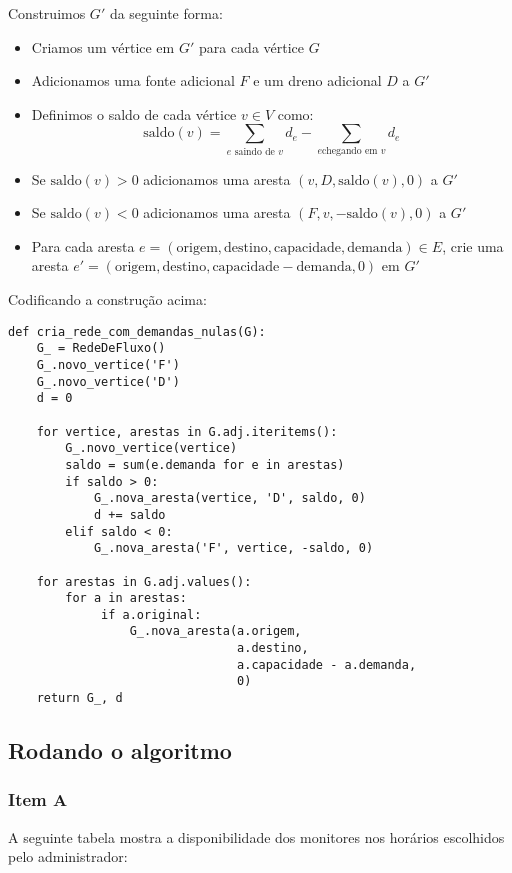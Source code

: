 \documentclass[11pt]{article}
\begin{document}
Construimos $G'$ da seguinte forma:

\begin{itemize}
\item Criamos um vértice em $G'$ para cada vértice $G$
\item Adicionamos uma fonte adicional $F$ e um dreno adicional $D$ a $G'$
\item Definimos o saldo de cada vértice $v \in V$ como: \[
  \textrm{saldo}(v) = \sum_{e \text{ saindo de }v}d_e - \sum_{e \text{
  chegando em }v}d_e \]
\item Se $\mathrm{saldo}(v) > 0$ adicionamos uma aresta $(v, D,
  \mathrm{saldo}(v), 0)$ a $G'$
\item Se $\mathrm{saldo}(v) < 0$ adicionamos uma aresta $(F, v,
  -\mathrm{saldo}(v), 0)$ a $G'$
\item Para cada aresta $e = (\mathrm{origem, destino, capacidade,
  demanda}) \in E$, crie uma aresta $e' = (\mathrm{origem, destino,
  capacidade - demanda, 0})$ em $G'$
\end{itemize}

Codificando a construção acima:
\begin{verbatim}
def cria_rede_com_demandas_nulas(G):
    G_ = RedeDeFluxo()
    G_.novo_vertice('F')
    G_.novo_vertice('D')
    d = 0

    for vertice, arestas in G.adj.iteritems():
        G_.novo_vertice(vertice)
        saldo = sum(e.demanda for e in arestas)
        if saldo > 0:
            G_.nova_aresta(vertice, 'D', saldo, 0)
            d += saldo
        elif saldo < 0:
            G_.nova_aresta('F', vertice, -saldo, 0)

    for arestas in G.adj.values():
        for a in arestas:
             if a.original:
                 G_.nova_aresta(a.origem,
                                a.destino,
                                a.capacidade - a.demanda,
                                0)
    return G_, d
\end{verbatim}

\subsection{Rodando o algoritmo}
\label{sec-2-5}

\subsubsection{Item A}
\label{sec-2-5-1}
A seguinte tabela mostra a disponibilidade dos monitores nos horários
escolhidos pelo administrador:
\end{document}

